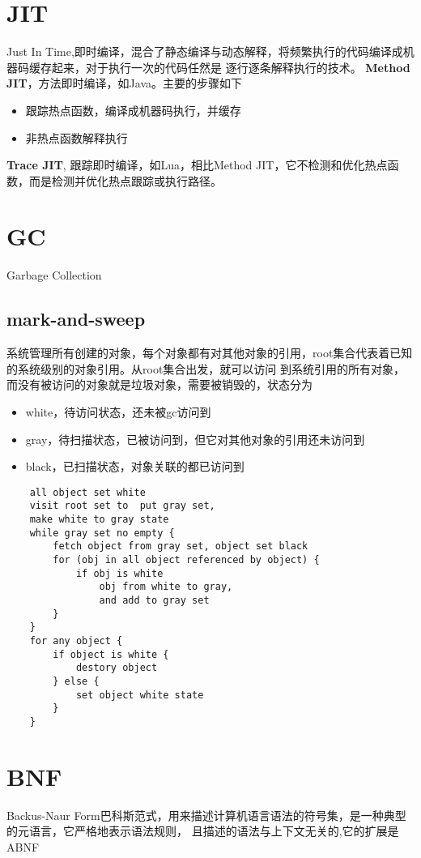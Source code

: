 \section{JIT}
Just In Time,即时编译，混合了静态编译与动态解释，将频繁执行的代码编译成机器码缓存起来，对于执行一次的代码任然是
逐行逐条解释执行的技术。
\newline
\textbf{Method JIT}，方法即时编译，如Java。主要的步骤如下
\begin{itemize}
    \item {跟踪热点函数，编译成机器码执行，并缓存}
    \item {非热点函数解释执行}
\end{itemize}
\textbf{Trace JIT}, 跟踪即时编译，如Lua，相比Method JIT，它不检测和优化热点函数，而是检测并优化热点跟踪或执行路径。

\section{GC}

Garbage Collection

\subsection{mark-and-sweep}
系统管理所有创建的对象，每个对象都有对其他对象的引用，root集合代表着已知的系统级别的对象引用。从root集合出发，就可以访问
到系统引用的所有对象，而没有被访问的对象就是垃圾对象，需要被销毁的，状态分为
\begin{itemize}
    \item {white，待访问状态，还未被gc访问到}
    \item {gray，待扫描状态，已被访问到，但它对其他对象的引用还未访问到}
    \item {black，已扫描状态，对象关联的都已访问到}
\end{itemize}
\begin{lstlisting}
    all object set white
    visit root set to  put gray set,
    make white to gray state 
    while gray set no empty {
        fetch object from gray set, object set black 
        for (obj in all object referenced by object) {
            if obj is white 
                obj from white to gray, 
                and add to gray set 
        }
    }
    for any object {
        if object is white {
            destory object 
        } else {
            set object white state
        }
    }
\end{lstlisting}

\section{BNF}
Backus-Naur Form巴科斯范式，用来描述计算机语言语法的符号集，是一种典型的元语言，它严格地表示语法规则，
且描述的语法与上下文无关的,它的扩展是ABNF 
\cite{ABNF}

